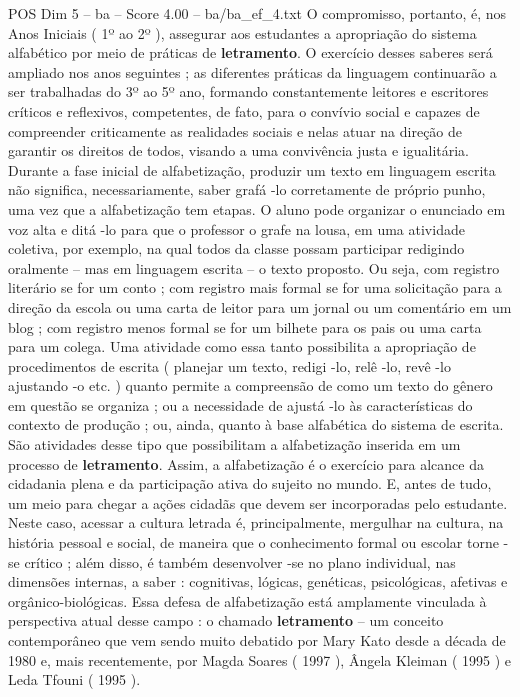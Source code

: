 \begin{textsample}{POS Dim 5 – ba – Score 4.00 – ba/ba\_ef\_4.txt}
O compromisso, portanto, é, nos Anos Iniciais ( 1º ao 2º ), assegurar aos estudantes a apropriação do sistema alfabético por meio de práticas de \textbf{letramento}.
O exercício desses saberes será ampliado nos anos seguintes ; as diferentes práticas da linguagem continuarão a ser trabalhadas do 3º ao 5º ano, formando constantemente leitores e escritores críticos e reflexivos, competentes, de fato, para o convívio social e capazes de compreender criticamente as realidades sociais e nelas atuar na direção de garantir os direitos de todos, visando a uma convivência justa e igualitária.
Durante a fase inicial de alfabetização, produzir um texto em linguagem escrita não significa, necessariamente, saber grafá -lo corretamente de próprio punho, uma vez que a alfabetização tem etapas.
O aluno pode organizar o enunciado em voz alta e ditá -lo para que o professor o grafe na lousa, em uma atividade coletiva, por exemplo, na qual todos da classe possam participar redigindo oralmente – mas em linguagem escrita – o texto proposto.
Ou seja, com registro literário se for um conto ; com registro mais formal se for uma solicitação para a direção da escola ou uma carta de leitor para um jornal ou um comentário em um blog ; com registro menos formal se for um bilhete para os pais ou uma carta para um colega.
Uma atividade como essa tanto possibilita a apropriação de procedimentos de escrita ( planejar um texto, redigi -lo, relê -lo, revê -lo ajustando -o etc. ) quanto permite a compreensão de como um texto do gênero em questão se organiza ; ou a necessidade de ajustá -lo às características do contexto de produção ; ou, ainda, quanto à base alfabética do sistema de escrita.
São atividades desse tipo que possibilitam a alfabetização inserida em um processo de \textbf{letramento}.
Assim, a alfabetização é o exercício para alcance da cidadania plena e da participação ativa do sujeito no mundo.
E, antes de tudo, um meio para chegar a ações cidadãs que devem ser incorporadas pelo estudante.
Neste caso, acessar a cultura letrada é, principalmente, mergulhar na cultura, na história pessoal e social, de maneira que o conhecimento formal ou escolar torne -se crítico ; além disso, é também desenvolver -se no plano individual, nas dimensões internas, a saber : cognitivas, lógicas, genéticas, psicológicas, afetivas e orgânico-biológicas.
Essa defesa de alfabetização está amplamente vinculada à perspectiva atual desse campo : o chamado \textbf{letramento} – um conceito contemporâneo que vem sendo muito debatido por Mary Kato desde a década de 1980 e, mais recentemente, por Magda Soares ( 1997 ), Ângela Kleiman ( 1995 ) e Leda Tfouni ( 1995 ).

\end{textsample}
